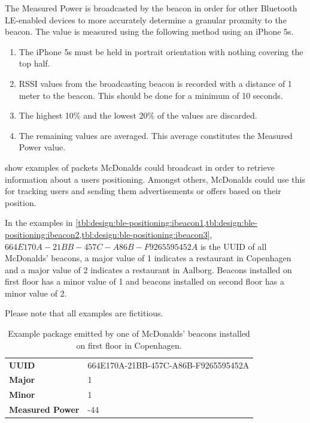 The Measured Power is broadcasted by the beacon in order for other Bluetooth LE-enabled devices to more accurately determine a granular proxmity to the beacon. The value is measured using the following method \cite{apple:proximity-beacon-spec} using an iPhone 5s.

\begin{enumerate}
\item The iPhone 5s must be held in portrait orientation with nothing covering the top half.
\item RSSI values from the broadcasting beacon is recorded with a distance of 1 meter to the beacon. This should be done for a minimum of 10 seconds.
\item The highest 10\% and the lowest 20\% of the values are discarded.
\item The remaining values are averaged. This average constitutes the Measured Power value.
\end{enumerate}

 show examples of packets McDonalds could broadcast in order to retrieve information about a users positioning. Amongst others, McDonalds could use this for tracking users and sending them advertisements or offers based on their position.

In the examples in \cref{tbl:design:ble-positioning:ibeacon1,tbl:design:ble-positioning:ibeacon2,tbl:design:ble-positioning:ibeacon3}, $664E170A-21BB-457C-A86B-F9265595452A$ is the UUID of all McDonalds' beacons, a major value of 1 indicates a restaurant in Copenhagen and a major value of 2 indicates a restaurant in Aalborg. Beacons installed on first floor has a minor value of 1 and beacons installed on second floor has a minor value of 2.

Please note that all examples are fictitious.

\begin{table}[h!]
\centering
\caption{Example package emitted by one of McDonalds' beacons installed on first floor in Copenhagen.}
\label{tbl:design:ble-positioning:ibeacon1}
\begin{tabular}{ll}
\textbf{UUID}  & 664E170A-21BB-457C-A86B-F9265595452A \\
\textbf{Major} & 1                                    \\
\textbf{Minor} & 1            \\                        
\textbf{Measured Power} & -44
\end{tabular}
\end{table}

